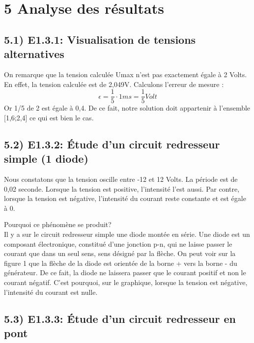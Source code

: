 \documentclass{report}
\begin{document}
\section*{5 Analyse des r\'esultats}
\subsection*{5.1) E1.3.1: Visualisation de tensions alternatives}
\hspace*{0.5cm}
On remarque que la tension calcul\'ee Umax n'est pas exactement \'egale \`a 2 Volts. En effet, la tension calcul\'ee est de 2,049V.
Calculons l'erreur de mesure :
\begin{equation}
    \epsilon = \frac{1}{5} \cdot 1ms = \frac{1}{5}Volt
\end{equation}
Or 1/5 de 2 est \'egale \`a 0,4. De ce fait, notre solution doit appartenir à l'ensemble [1,6;2,4] ce qui est bien le cas.

\subsection*{5.2) E1.3.2: \'Etude d'un circuit redresseur simple (1 diode)}
\hspace*{0.5cm}

Nous constatons que la tension oscille entre -12 et 12 Volts. La p\'eriode est de 0,02 seconde. Lorsque la tension est positive, l'intensit\'e l'est aussi. Par contre, lorsque la tension est n\'egative, l'intensit\'e du courant reste constante et est \'egale \`a 0.

Pourquoi ce ph\'enom\`ene se produit?
\\

Il y a sur le circuit redresseur simple une diode mont\'ee en s\'erie. Une diode est un composant \'electronique, constitu\'e d'une jonction p-n, qui ne laisse passer le courant que dans un seul sens, sens d\'esign\'e par la fl\`eche. On peut voir sur la figure 1 que la fl\`eche de la diode est orient\'ee de la borne + vers la borne - du g\'en\'erateur. De ce fait, la diode ne laissera passer que le courant positif et non le courant n\'egatif. C'est pourquoi, sur le graphique, lorsque la tension est n\'egative, l'intensit\'e du courant est nulle.

\subsection*{5.3) E1.3.3: \'Etude d'un circuit redresseur en pont}
\hspace*{0.5cm}
\\
\end{document}
